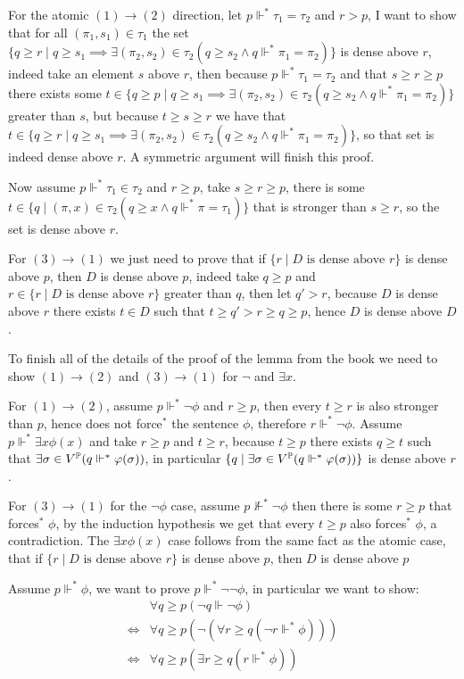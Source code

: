 For the atomic $(1)\to(2)$ direction, let $p\Vdash^*\tau_1=\tau_2$ and $r>p$, I want to show that for all $(\pi_1,s_1)\in\tau_1$ the set $\{q\ge r\mid q\ge s_1\implies \exists(\pi_2,s_2)\in\tau_2(q\ge s_2\land q\Vdash^*\pi_1=\pi_2)\}$ is dense above $r$, indeed take an element $s$ above $r$, then because $p\Vdash^*\tau_1=\tau_2$ and that $s\ge r\ge p$ there exists some $t\in \{q\ge p\mid q\ge s_1\implies \exists(\pi_2,s_2)\in\tau_2(q\ge s_2\land q\Vdash^*\pi_1=\pi_2)\}$ greater than $s$, but because $t\ge s\ge r$ we have that $t\in \{q\ge r\mid q\ge s_1\implies \exists(\pi_2,s_2)\in\tau_2(q\ge s_2\land q\Vdash^*\pi_1=\pi_2)\}$, so that set is indeed dense above $r$. A symmetric argument will finish this proof.

Now assume $p\Vdash^* \tau_1\in\tau_2$ and $r\ge p$, take $s\ge r\ge p$, there is some $t\in\{q\mid (\pi,x)\in\tau_2(q\ge x\land q\Vdash^*\pi=\tau_1)\}$ that is stronger than $s\ge r$, so the set is dense above $r$.

For $(3)\to(1)$ we just need to prove that if $\{r\mid D\text{ is dense above }r\}$ is dense above $p$, then $D$ is dense above $p$, indeed take $q\ge p$ and $r\in \{r\mid D\text{ is dense above }r\}$ greater than $q$, then let $q'>r$, because $D$ is dense above $r$ there exists $t\in D$ such that $t\ge q'>r\ge q\ge p$, hence $D$ is dense above $D$.

To finish all of the details of the proof of the lemma from the book we need to show $(1)\to(2)$ and $(3)\to(1)$ for $\lnot$ and $\exists x$.

For $(1)\to(2)$, assume $p\Vdash^*\lnot\phi$ and $r\ge p$, then every $t\ge r$ is also stronger than $p$, hence does not force$^*$ the sentence $\phi$, therefore $r\Vdash^* \lnot\phi$. Assume $p\Vdash^*\exists x \phi(x)$ and take $r\ge p$ and $t\ge r$, because $t\ge p$ there exists $q\ge t$ such that $\exists \sigma\in V^\Bbb P (q\Vdash^* \phi(\sigma))$, in particular $\{q\mid \exists \sigma\in V^\Bbb P (q\Vdash^* \phi(\sigma))\}$ is dense above $r$.

For $(3)\to(1)$ for the $\lnot\phi$ case, assume $p\not\Vdash^* \lnot\phi$ then there is some $r\ge p$ that forces$^*$ $\phi$, by the induction hypothesis we get that every $t\ge p$ also forces$^*$ $\phi$, a contradiction. The $\exists x\phi(x)$ case follows from the same fact as the atomic case, that if $\{r\mid D\text{ is dense above }r\}$ is dense above $p$, then $D$ is dense above $p$

\sub{}
Assume $p\Vdash^* \phi$, we want to prove $p\Vdash^*\lnot\lnot\phi$, in particular we want to show:
\begin{align*}
	&\forall q\ge p (\lnot q\Vdash\lnot \phi)\\
	\iff&\forall q\ge p (\lnot (\forall r\ge q (\lnot r\Vdash^*\phi)))\\
	\iff&\forall q\ge p  (\exists r\ge q (r\Vdash^*\phi))
\end{align*}


